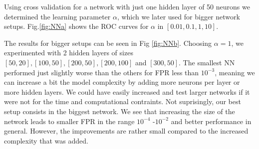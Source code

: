 Using cross validation for a network with just one hidden layer of 50 neurons we determined the learning parameter $\alpha$, which we later used for bigger network setups. Fig.\ref{fig:NNa}  shows the ROC curves for $\alpha$ in  $[0.01,0.1,1,10]$.

The results for bigger setups can be seen in Fig \ref{fig:NNb}. Choosing $\alpha=1$, we experimented with 2 hidden layers of sizes $[50,20],[100,50],[200,50],[200,100]$ and $[300,50]$. The smallest NN performed just slightly worse than the others for FPR less than $10^{-3}$, meaning we  can increase a bit the model complexity by adding more neurons per layer or more hidden layers.  We could have easily increased and test larger networks if it were not for the time and computational contraints. Not suprisingly, our best setup consists in the biggest network. We see that increasing the size of the network leads to smaller FPR in the range $10^{-4}$ -$10^{-2}$ and better performance in general. However, the improvements are rather small compared to the increased complexity that was added.

